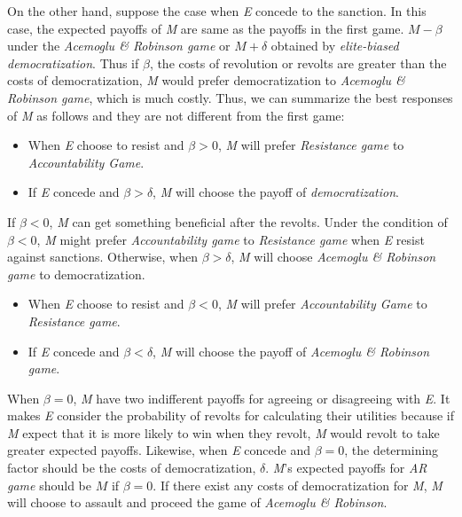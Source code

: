 \documentclass[11pt]{article}
\begin{document}
	On the other hand, suppose the case when \textit{E} concede to the sanction. In this case, the expected payoffs of \textit{M} are same as the payoffs in the first game. $M-\beta$ under the \textit{Acemoglu \& Robinson game} or $M + \delta$ obtained by \textit{elite-biased democratization}. Thus if $\beta$, the costs of revolution or revolts are greater than the costs of democratization, \textit{M} would prefer democratization to \textit{Acemoglu \& Robinson game}, which is much costly. Thus, we can summarize the best responses of \textit{M} as follows and they are not different from the first game:
	
	\begin{itemize}
		\item When \textit{E} choose to resist and $\beta > 0$, \textit{M} will prefer \textit{Resistance game} to \textit{Accountability Game}.
		\item If \textit{E} concede and $\beta > \delta$, \textit{M} will choose the payoff of \textit{democratization}.
	\end{itemize}
	
	If $\beta < 0$, \textit{M} can get something beneficial after the revolts. Under the condition of $\beta < 0$, \textit{M} might prefer \textit{Accountability game} to \textit{Resistance game} when \textit{E} resist against sanctions. Otherwise, when $\beta > \delta$, \textit{M} will choose \textit{Acemoglu \& Robinson game} to democratization. 
	\begin{itemize}
		\item When \textit{E} choose to resist and $\beta < 0$, \textit{M} will prefer \textit{Accountability Game} to \textit{Resistance game}.
		\item If \textit{E} concede and $\beta < \delta$, \textit{M} will choose the payoff of \textit{Acemoglu \& Robinson game}.
	\end{itemize}
	
	When $\beta = 0$, \textit{M} have two indifferent payoffs for agreeing or disagreeing with \textit{E}. It makes \textit{E} consider the probability of revolts for calculating their utilities because if \textit{M} expect that it is more likely to win when they revolt, \textit{M} would revolt to take greater expected payoffs.    Likewise, when \textit{E} concede and $\beta = 0$, the determining factor should be the costs of democratization, $\delta$. \textit{M}'s expected payoffs for \textit{AR game} should be $M$ if $\beta = 0$. If there exist any costs of democratization for \textit{M}, \textit{M} will choose to assault and proceed the game of \textit{Acemoglu \& Robinson}. 
	
\end{document}
